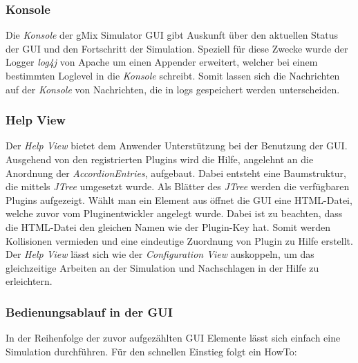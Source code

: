 \documentclass[a4paper, 11pt]{article} %
\begin{document}
\subsubsection{Konsole} %
\label{ssub:consoleview}
Die \emph{Konsole} der gMix Simulator GUI gibt Auskunft über den aktuellen Status der GUI und den Fortschritt der Simulation. Speziell für diese Zwecke wurde der Logger \emph{log4j} von Apache um einen Appender erweitert, welcher bei einem bestimmten Loglevel in die \emph{Konsole} schreibt. Somit lassen sich die Nachrichten auf der \emph{Konsole} von Nachrichten, die in logs gespeichert werden unterscheiden.

\subsubsection{Help View} %
\label{ssub:helpview}
Der \emph{Help View} bietet dem Anwender Unterstützung bei der Benutzung der GUI. Ausgehend von den registrierten Plugins wird die Hilfe, angelehnt an die Anordnung der \emph{AccordionEntries}, aufgebaut. Dabei entsteht eine Baumstruktur, die mittels \emph{JTree} umgesetzt wurde. Als Blätter des \emph{JTree} werden die verfügbaren Plugins aufgezeigt. Wählt man ein Element aus öffnet die GUI eine HTML-Datei, welche zuvor vom Pluginentwickler angelegt wurde. Dabei ist zu beachten, dass die HTML-Datei den gleichen Namen wie der Plugin-Key hat. Somit werden Kollisionen vermieden und eine eindeutige Zuordnung von Plugin zu Hilfe erstellt. Der \emph{Help View} lässt sich wie der \emph{Configuration View} auskoppeln, um das gleichzeitige Arbeiten an der Simulation und Nachschlagen in der Hilfe zu erleichtern.

\subsubsection{Bedienungsablauf in der GUI}
\label{ssub:bedienung}
In der Reihenfolge der zuvor aufgezählten GUI Elemente lässt sich einfach eine Simulation durchführen. Für den schnellen Einstieg folgt ein HowTo:
\end{document}
